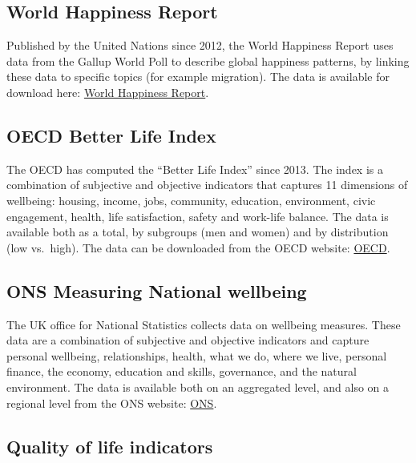 \documentclass[
]{book}
\begin{document}
\hypertarget{world-happiness-report}{%
\subsection*{World Happiness Report}\label{world-happiness-report}}

Published by the United Nations since 2012, the World Happiness Report uses data from the Gallup World Poll to describe global happiness patterns, by linking these data to specific topics (for example migration). The data is available for download here: \href{http://worldhappiness.report/}{World Happiness Report}.

\hypertarget{oecd-better-life-index}{%
\subsection*{OECD Better Life Index}\label{oecd-better-life-index}}

The OECD has computed the ``Better Life Index'' since 2013. The index is a combination of subjective and objective indicators that captures 11 dimensions of wellbeing: housing, income, jobs, community, education, environment, civic engagement, health, life satisfaction, safety and work-life balance. The data is available both as a total, by subgroups (men and women) and by distribution (low vs.~high). The data can be downloaded from the OECD website: \href{https://stats.oecd.org/}{OECD}.

\hypertarget{ons-measuring-national-wellbeing}{%
\subsection*{ONS Measuring National wellbeing}\label{ons-measuring-national-wellbeing}}

The UK office for National Statistics collects data on wellbeing measures. These data are a combination of subjective and objective indicators and capture personal wellbeing, relationships, health, what we do, where we live, personal finance, the economy, education and skills, governance, and the natural environment. The data is available both on an aggregated level, and also on a regional level from the ONS website: \href{https://www.ons.gov.uk/peoplepopulationandcommunity/wellbeing}{ONS}.

\hypertarget{quality-of-life-indicators}{%
\subsection*{Quality of life indicators}\label{quality-of-life-indicators}}
\end{document}
